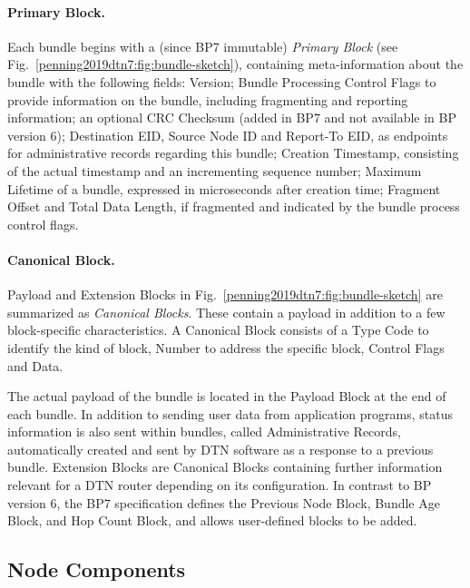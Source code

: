 \paragraph{Primary Block.}

Each bundle begins with a (since BP7 immutable) \textit{Primary Block} (see  Fig.~\ref{penning2019dtn7:fig:bundle-sketch}),  containing 
meta-information about the bundle with the following fields:
Version;
Bundle Processing Control Flags to provide information on the bundle, including fragmenting and reporting information;
an optional CRC Checksum (added in BP7 and not available in BP version 6);
Destination EID, Source Node ID and Report-To EID, as  endpoints for administrative records regarding this bundle;
Creation Timestamp, consisting of the actual timestamp and an incrementing sequence number;
Maximum Lifetime of a bundle, expressed in microseconds after creation time;
Fragment Offset and Total Data Length, if fragmented and indicated by the bundle process control flags.

\paragraph{Canonical Block.}
Payload and Extension Blocks in Fig.~\ref{penning2019dtn7:fig:bundle-sketch} are summarized as \textit{Canonical Blocks}. 
These contain a payload in addition to a few block-specific characteristics.
A Canonical Block consists of a Type Code to identify the kind of block, Number to address the specific block, Control Flags and Data. 

The actual payload of the bundle is located in the Payload Block at the end of each bundle.
In addition to sending user data from application programs, status information is also sent within bundles, called Administrative Records, automatically created and sent by DTN software as a response to a previous bundle. 
Extension Blocks are Canonical Blocks containing further information relevant for a DTN router depending on its configuration.
In contrast to BP version 6, the BP7 specification defines the Previous Node Block, Bundle Age Block, and Hop Count Block, and allows user-defined blocks to be added.



\subsection{Node Components}

